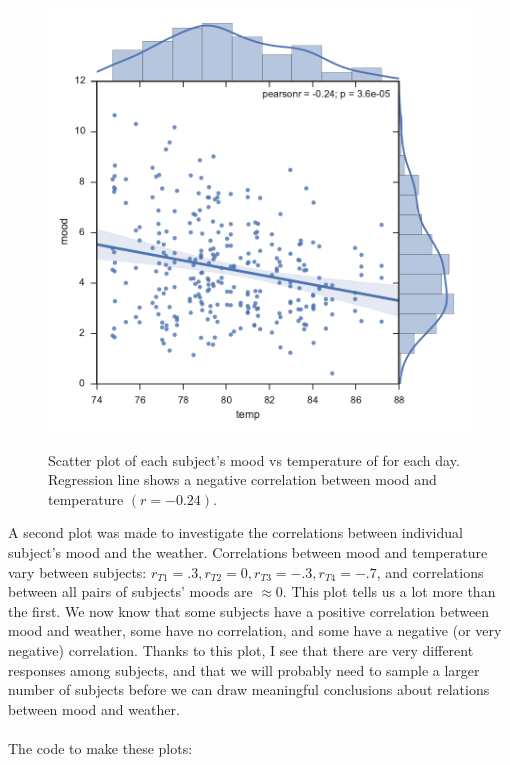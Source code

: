 \documentclass[onecolumn,10pt]{jhwhw}
\begin{document}
\begin{figure}[b!]
\begin{center}
\includegraphics[height=0.5\textheight]{p1-mean.pdf}
\label{fig:on}
\end{center}
\caption{Scatter plot of each subject's mood vs temperature of for each day. Regression line shows a negative correlation between mood and temperature $(r=-0.24)$. }
\end{figure}
A second plot was made to investigate the correlations between individual subject's mood and the weather. Correlations between mood and temperature vary between subjects: $r_{T1} = .3, r_{T2} = 0, r_{T3} = -.3, r_{T4} = -.7$, and correlations between all pairs of subjects' moods are $\approx 0$. This plot tells us a lot more than the first. We now know that some subjects have a positive correlation between mood and weather, some have no correlation, and some have a negative (or very negative) correlation. Thanks to this plot, I see that there are very different responses among subjects, and that we will probably need to sample a larger number of subjects before we can draw meaningful conclusions about relations between mood and weather.\\
\\
The code to make these plots:
\end{document}
